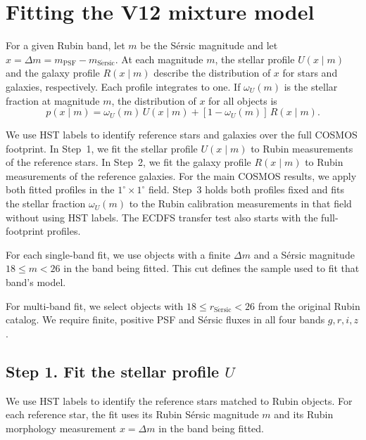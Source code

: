 \FloatBarrier
\appendix
\section{Fitting the V12 mixture model}
\label{app:v12-fitting}

For a given Rubin band, let \(m\) be the S\'{e}rsic magnitude and let
\(x=\Delta m=m_{\mathrm{PSF}}-m_{\mathrm{S\acute{e}rsic}}\).
At each magnitude \(m\), the stellar profile \(U(x\mid m)\) and the
galaxy profile \(R(x\mid m)\) describe the distribution of \(x\) for
stars and galaxies, respectively. Each profile integrates to one. If
\(\omega_U(m)\) is the stellar fraction at magnitude \(m\), the
distribution of \(x\) for all objects is
\begin{equation}
 p(x\mid m)=\omega_U(m)\,U(x\mid m)+[1-\omega_U(m)]\,R(x\mid m).
 \label{eq:v12-mixture}
\end{equation}

We use HST labels to identify reference stars and galaxies over the
full COSMOS footprint. In Step~1, we fit the stellar profile \(U(x\mid m)\)
to Rubin measurements of the reference stars. In Step~2, we fit the
galaxy profile \(R(x\mid m)\) to Rubin measurements of the reference
galaxies. For the main COSMOS results, we apply both fitted profiles
in the \(1^\circ\times1^\circ\) field. Step~3 holds both profiles
fixed and fits the stellar fraction \(\omega_U(m)\) to the Rubin
calibration measurements in that field without using HST labels.
The ECDFS transfer test also starts with the full-footprint profiles.

For each single-band fit, we use objects with a finite \(\Delta m\)
and a S\'{e}rsic magnitude \(18 \leq m < 26\) in the band being fitted.
This cut defines the sample used to fit that band's model.

For multi-band fit, we select objects with \(18 \leq r_{\mathrm{S\acute{e}rsic}} < 26\) from the original Rubin catalog.
We require finite, positive PSF and S\'{e}rsic fluxes in all four bands
\(g,r,i,z\).

\subsection{Step 1. Fit the stellar profile \texorpdfstring{\(U\)}{U}}

We use HST labels to identify the reference stars matched to
Rubin objects. For each reference star, the fit uses its Rubin
S\'{e}rsic magnitude \(m\) and its Rubin morphology measurement
\(x=\Delta m\) in the band being fitted.

